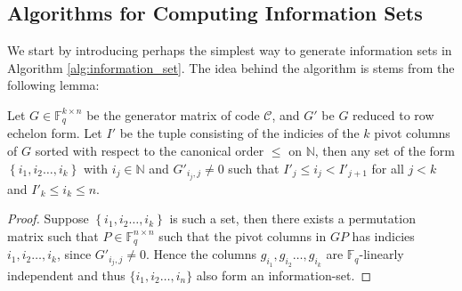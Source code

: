 \subsection{Algorithms for Computing Information Sets}
We start by introducing perhaps the simplest way to generate information sets in Algorithm \ref{alg:information_set}. The idea behind the algorithm is stems from the following lemma:
\begin{lemma}\label{lem:new_information_sets}
  Let $G \in \mathbb{F}_q^{k \times n}$ be the generator matrix of code $\mathcal{C}$, and $G'$ be $G$ reduced to row echelon form. Let $I'$ be the tuple consisting of the indicies of the $k$ pivot columns of $G$ sorted with respect to the canonical order $\leq$ on $\mathbb{N}$, then any set of the form $\left\{i_1, i_2 \ldots, i_{k}\right\}$ with $i_j \in \mathbb{N}$ and $G'_{i_j,j} \neq 0$ such that $I'_j \leq i_j < I'_{j + 1}$ for all $j < k$ and $I'_k \leq i_k \leq n$.
\end{lemma}
\begin{proof}
  Suppose $\left\{i_1, i_2 \ldots, i_{k}\right\}$ is such a set, then there exists a permutation matrix such that $P \in \mathbb{F}_q^{n \times n}$ such that the pivot columns in $GP$ has indicies $i_1, i_2 \ldots, i_{k}$, since $G'_{i_{j}, j} \neq 0$. Hence the columns $g_{i_1}, g_{i_2} \ldots, g_{i_{k}}$ are $\mathbb{F}_q$-linearly independent and thus $\{i_1, i_2 \ldots, i_{n}\}$ also form an information-set.
\end{proof}

